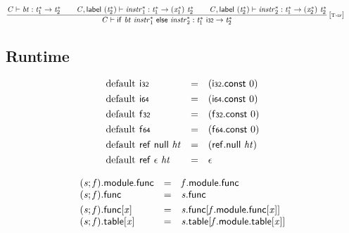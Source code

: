 \documentclass[a4paper]{scrartcl}
\begin{document}
$$
\begin{array}{@{}c@{}}\displaystyle
\frac{
{\mathit{C}} \vdash {\mathit{bt}} : {{\mathit{t}}_{{1}}^\ast} \rightarrow {{\mathit{t}}_{{2}}^\ast}
 \qquad
{\mathit{C}}, \mathsf{label}~({{\mathit{t}}_{{2}}^\ast}) \vdash {{\mathit{instr}}_{{1}}^\ast} : {{\mathit{t}}_{{1}}^\ast} \rightarrow ({{\mathit{x}}_{{1}}^\ast})~{{\mathit{t}}_{{2}}^\ast}
 \qquad
{\mathit{C}}, \mathsf{label}~({{\mathit{t}}_{{2}}^\ast}) \vdash {{\mathit{instr}}_{{2}}^\ast} : {{\mathit{t}}_{{1}}^\ast} \rightarrow ({{\mathit{x}}_{{2}}^\ast})~{{\mathit{t}}_{{2}}^\ast}
}{
{\mathit{C}} \vdash \mathsf{if}~{\mathit{bt}}~{{\mathit{instr}}_{{1}}^\ast}~\mathsf{else}~{{\mathit{instr}}_{{2}}^\ast} : {{\mathit{t}}_{{1}}^\ast}~\mathsf{i{\scriptstyle32}} \rightarrow {{\mathit{t}}_{{2}}^\ast}
} \, {[\textsc{\scriptsize T{-}if}]}
\qquad
\end{array}
$$


\subsection*{Runtime}

$$
\begin{array}{@{}lcl@{}l@{}}
{{\mathrm{default}}}_{}~\mathsf{i{\scriptstyle32}} &=& (\mathsf{i{\scriptstyle32}}.\mathsf{const}~0) &  \\[0.8ex]
{{\mathrm{default}}}_{}~\mathsf{i{\scriptstyle64}} &=& (\mathsf{i{\scriptstyle64}}.\mathsf{const}~0) &  \\[0.8ex]
{{\mathrm{default}}}_{}~\mathsf{f{\scriptstyle32}} &=& (\mathsf{f{\scriptstyle32}}.\mathsf{const}~0) &  \\[0.8ex]
{{\mathrm{default}}}_{}~\mathsf{f{\scriptstyle64}} &=& (\mathsf{f{\scriptstyle64}}.\mathsf{const}~0) &  \\[0.8ex]
{{\mathrm{default}}}_{}~\mathsf{ref}~\mathsf{null}~{\mathit{ht}} &=& (\mathsf{ref.null}~{\mathit{ht}}) &  \\[0.8ex]
{{\mathrm{default}}}_{}~\mathsf{ref}~\epsilon~{\mathit{ht}} &=& \epsilon &  \\
\end{array}
$$

$$
\begin{array}{@{}lcl@{}l@{}}
({\mathit{s}} ; {\mathit{f}}).\mathsf{module}.\mathsf{func} &=& {\mathit{f}}.\mathsf{module}.\mathsf{func} &  \\
({\mathit{s}} ; {\mathit{f}}).\mathsf{func} &=& {\mathit{s}}.\mathsf{func} &  \\[0.8ex]
{({\mathit{s}} ; {\mathit{f}}).\mathsf{func}}{[{\mathit{x}}]} &=& {\mathit{s}}.\mathsf{func}[{\mathit{f}}.\mathsf{module}.\mathsf{func}[{\mathit{x}}]] &  \\
{({\mathit{s}} ; {\mathit{f}}).\mathsf{table}}{[{\mathit{x}}]} &=& {\mathit{s}}.\mathsf{table}[{\mathit{f}}.\mathsf{module}.\mathsf{table}[{\mathit{x}}]] &  \\
\end{array}
$$
\end{document}
